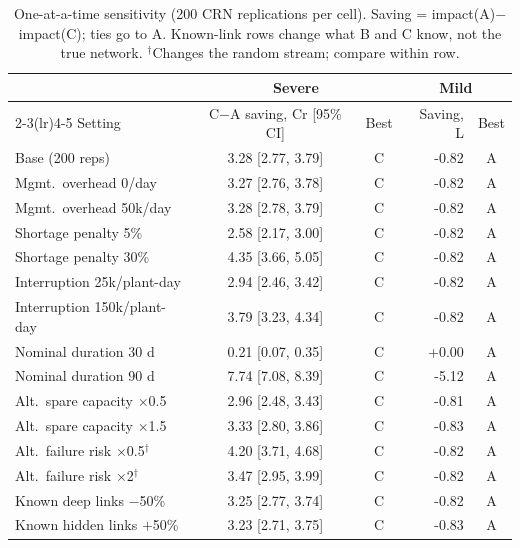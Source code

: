 \begin{table}[t]\centering\caption{One-at-a-time sensitivity (200 CRN replications per cell). Saving = impact(A)$-$impact(C); ties go to A. Known-link rows change what B and C know, not the true network. $^\dagger$Changes the random stream; compare within row.}\label{tab:sens}
\scriptsize\setlength{\tabcolsep}{2pt}\begin{tabular}{@{}lccrc@{}}\toprule
 & \multicolumn{2}{c}{Severe} & \multicolumn{2}{c}{Mild}\\\cmidrule(lr){2-3}\cmidrule(lr){4-5}
Setting & C$-$A saving, Cr [95\% CI] & Best & Saving, L & Best\\\midrule
Base (200 reps) & 3.28 [2.77, 3.79] & C & -0.82 & A\\
Mgmt.\ overhead 0/day & 3.27 [2.76, 3.78] & C & -0.82 & A\\
Mgmt.\ overhead 50k/day & 3.28 [2.78, 3.79] & C & -0.82 & A\\
Shortage penalty 5\% & 2.58 [2.17, 3.00] & C & -0.82 & A\\
Shortage penalty 30\% & 4.35 [3.66, 5.05] & C & -0.82 & A\\
Interruption 25k/plant-day & 2.94 [2.46, 3.42] & C & -0.82 & A\\
Interruption 150k/plant-day & 3.79 [3.23, 4.34] & C & -0.82 & A\\
Nominal duration 30 d & 0.21 [0.07, 0.35] & C & +0.00 & A\\
Nominal duration 90 d & 7.74 [7.08, 8.39] & C & -5.12 & A\\
Alt.\ spare capacity $\times$0.5 & 2.96 [2.48, 3.43] & C & -0.81 & A\\
Alt.\ spare capacity $\times$1.5 & 3.33 [2.80, 3.86] & C & -0.83 & A\\
Alt.\ failure risk $\times$0.5$^\dagger$ & 4.20 [3.71, 4.68] & C & -0.82 & A\\
Alt.\ failure risk $\times$2$^\dagger$ & 3.47 [2.95, 3.99] & C & -0.82 & A\\
Known deep links $-$50\% & 3.25 [2.77, 3.74] & C & -0.82 & A\\
Known hidden links $+$50\% & 3.23 [2.71, 3.75] & C & -0.83 & A\\
\bottomrule\end{tabular}\end{table}